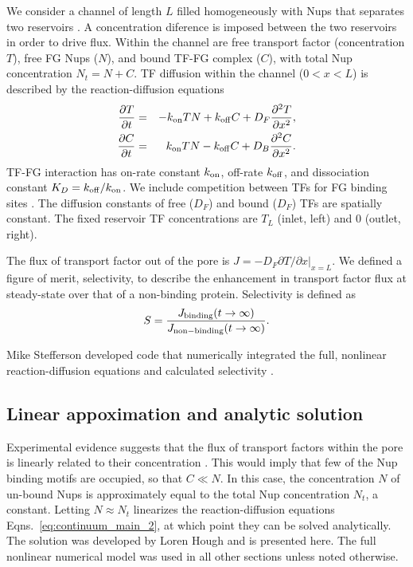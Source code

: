 We consider a channel of length $L$ filled homogeneously with Nups
that separates two reservoirs .  A concentration diference is imposed between the two reservoirs in order to drive flux.  Within the
channel are free transport factor (concentration $T$), free FG Nups
($N$), and bound TF-FG complex ($C$), with total Nup concentration
$N_t= N+C$.  TF diffusion within the channel ($0<x<L$) is described by
the reaction-diffusion equations
\begin{eqnarray}
  \frac{\partial T}{\partial t} &=& -k_{\rm on} T N+k_{\rm off} C +D_F
       \frac{\partial^2 T}{\partial x^2},\label{eq:continuum_main} 
   \\ 
  \frac{\partial C}{\partial t} &=& k_{\rm on} T N -k_{\rm off} C + 
        D_B \frac{\partial^2 C}{\partial x^2} .
\label{eq:continuum_main_2} 
\end{eqnarray}
TF-FG interaction has on-rate constant $k_{\rm on}$, off-rate $k_{\rm off}$, and
dissociation constant $K_D =k_{\rm off}/k_{\rm on}$.  We include competition
between TFs for FG binding sites \cite{timney16}.  The
diffusion constants of free ($D_F$) and bound ($D_F$) TFs are
spatially constant. The fixed reservoir TF concentrations are $T_L$
(inlet, left) and 0 (outlet, right).

The flux of transport factor out of the pore is
$J = - D_F \left. \partial T/\partial x \right|_{x=L}$.
We defined a figure of merit, selectivity, to describe the enhancement in transport factor flux at steady-state over that of a non-binding protein.  Selectivity is defined as
\begin{equation}
  S =  \frac{J_{\rm binding}(t \to \infty)}{J_{\rm non-binding}(t \to \infty)} .
\end{equation}

Mike Stefferson developed code that numerically integrated the full, nonlinear reaction-diffusion equations and calculated selectivity \cite{stefferson18}.

\subsection{Linear appoximation and analytic solution}
\label{sec:linear}
Experimental evidence suggests that the flux of transport factors within the pore is linearly related to their concentration \cite{timney06, schmidt15}.  This would imply that few of the Nup binding motifs are occupied, so that $C \ll N$.  In this case, the concentration $N$ of un-bound Nups is approximately equal to the total Nup concentration $N_t$, a constant.  Letting $N \approx N_t$ linearizes the reaction-diffusion equations Eqns.~\ref{eq:continuum_main_2}, at which point they can be solved analytically.  The solution was developed by Loren Hough and is presented here.  The full nonlinear numerical model was used in all other sections unless noted otherwise.

